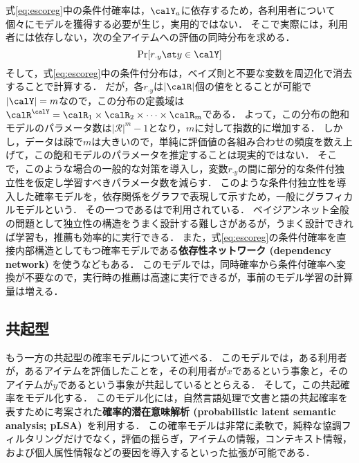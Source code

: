 式\eqref{eq:escoreg}中の条件付確率は，$\calY_a$に依存するため，各利用者について個々にモデルを獲得する必要が生じ，実用的ではない．
そこで実際には，利用者には依存しない，次の全アイテムへの評価の同時分布を求める．
\begin{equation}
\Pr[r_{\cdot y}\st y\in \calY]
\label{eq:jprob}
\end{equation}
そして，式\eqref{eq:escoreg}中の条件付分布は，ベイズ則と不要な変数を周辺化で消去することで計算する．
だが，各$r_{\cdot y}$は$|\calR|$個の値をとることが可能で$|\calY|=m$なので，この分布の定義域は$\calR^{\calY}=\calR_{1}\times\calR_{2}\times\dotsb\times\calR_{m}$である．
よって，この分布の飽和モデルのパラメータ数は$|\mathcal{R}|^m-1$となり，$m$に対して指数的に増加する．
しかし，データは疎で$m$は大きいので，単純に評価値の各組み合わせの頻度を数え上げて，この飽和モデルのパラメータを推定することは現実的ではない．
そこで，このような場合の一般的な対策を導入し，変数$r_{\cdot y}$の間に部分的な条件付独立性を仮定し学習すべきパラメータ数を減らす．
このような条件付独立性を導入した確率モデルを，依存関係をグラフで表現して示すため，一般にグラフィカルモデルという．
その一つである\cite{j:0067}は\cite{uai:98:01}で利用されている．
ベイジアンネット全般の問題として独立性の構造をうまく設計する難しさがあるが，うまく設計できれば学習も，推薦も効率的に実行できる．
また，式\eqref{eq:escoreg}の条件付確率を直接内部構造としてもつ確率モデルである\textbf{依存性ネットワーク (dependency network) }を使う\cite{jmlr:00:01}などもある．
このモデルでは，同時確率から条件付確率へ変換が不要なので，実行時の推薦は高速に実行できるが，事前のモデル学習の計算量は増える．

\subsection{共起型}

もう一方の共起型の確率モデルについて述べる．
このモデルでは，ある利用者が，あるアイテムを評価したことを，その利用者が$x$であるという事象と，そのアイテムが$y$であるという事象が共起しているととらえる．
そして，この共起確率をモデル化する．
このモデル化には，自然言語処理で文書と語の共起確率を表すために考案された\textbf{確率的潜在意味解析 (probabilistic latent semantic analysis; pLSA)}~\cite{uai:99:01}を利用する．
この確率モデルは非常に柔軟で，純粋な協調フィルタリングだけでなく，評価の揺らぎ，アイテムの情報，コンテキスト情報，および個人属性情報などの要因を導入するといった拡張が可能である．

